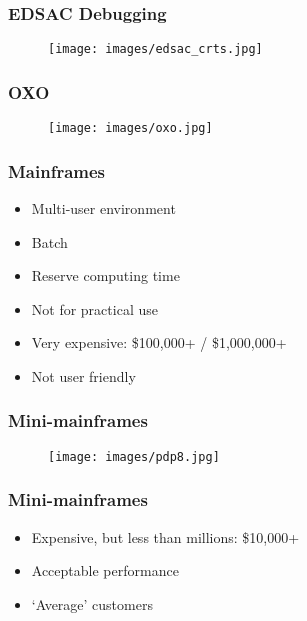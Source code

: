 \documentclass[aspectratio=43]{uva-inf-presentation}
\begin{document}

\begin{frame}
\frametitle{EDSAC Debugging}

\begin{figure}
\texttt{[image: images/edsac\_crts.jpg]}
\end{figure}

\end{frame}


\begin{frame}
\frametitle{OXO}

\begin{figure}
\texttt{[image: images/oxo.jpg]}
\end{figure}

\end{frame}


\begin{frame}
\frametitle{Mainframes}

\begin{itemize}
\item Multi-user environment
\item Batch
\item Reserve computing time
\item Not for practical use
\item Very expensive: \$100,000+ / \$1,000,000+
\item Not user friendly
\end{itemize}

\end{frame}


\begin{frame}
\frametitle{Mini-mainframes}

\begin{figure}
\texttt{[image: images/pdp8.jpg]}
\end{figure}

\end{frame}


\begin{frame}
\frametitle{Mini-mainframes}

\begin{itemize}
\item Expensive, but less than millions: \$10,000+
\item Acceptable performance
\item `Average' customers
\end{itemize}

\end{frame}
\end{document}
